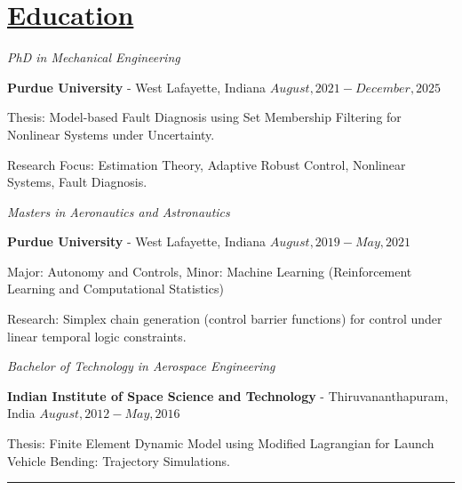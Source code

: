 \section*{\underline{Education}}

\noindent \textit{PhD in Mechanical Engineering}

\textbf{Purdue University} - West Lafayette, Indiana \hfill $August, 2021 - December, 2025$

Thesis: Model-based Fault Diagnosis using Set Membership Filtering for Nonlinear Systems under Uncertainty.

Research Focus: Estimation Theory, Adaptive Robust Control, Nonlinear Systems, Fault Diagnosis.

\medskip

\noindent \textit{Masters in Aeronautics and Astronautics}

\textbf{Purdue University} - West Lafayette, Indiana \hfill $August, 2019 - May, 2021$

Major: Autonomy and Controls, Minor: Machine Learning (Reinforcement Learning and Computational Statistics)

Research: Simplex chain generation (control barrier functions) for control under linear temporal logic constraints.

\medskip

\noindent \textit{Bachelor of Technology in Aerospace Engineering }

\textbf{Indian Institute of Space Science and Technology} - Thiruvananthapuram, India \hfill $ August, 2012 - May, 2016 $

Thesis: Finite Element Dynamic Model using Modified Lagrangian for Launch Vehicle Bending: Trajectory Simulations.
\noindent\rule{\textwidth}{0.4pt}
